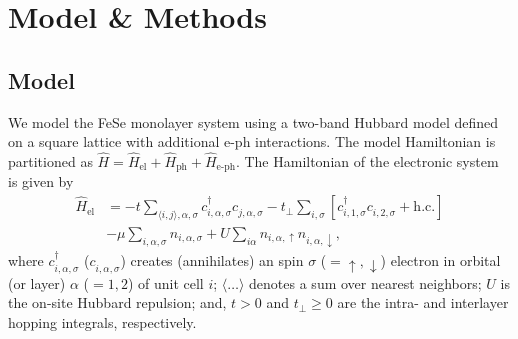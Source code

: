 \documentclass[%
 reprint,
 superscriptaddress,
nofootinbib,
nobibnotes,
 amsmath,amssymb,
 aps,
 prb,
 dvipsnames, 
 floatfix
]{revtex4-2}
\newcommand{\eph}{e-ph}
\newcommand{\pdag}{{\phantom\dagger}}
\begin{document}
\section{Model \& Methods}
\label{Sec:Model}

\subsection{Model}
We model the FeSe monolayer system using a two-band Hubbard model \cite{Mishra2016,Linscheid2016,Pelliciari:2020tu} defined on a square lattice with additional {\eph} interactions. The model Hamiltonian is partitioned as $\hat{H} = \hat{H}_{\text{el}} + \hat{H}_{\text{ph}} + \hat{H}_{\text{\eph}}$. The Hamiltonian of the electronic system is given by  
\begin{align}
    \hat{H}_{\text{el}} &= -t\sum_{\langle i,j\rangle,\alpha, \sigma} 
    c^\dagger_{i,\alpha,\sigma}c^\pdag_{j,\alpha,\sigma} 
    - t^\pdag_\perp \sum_{i,\sigma} \left[c^\dagger_{i, 1, \sigma} c^\pdag_{i, 2, \sigma} + \mathrm{h.c.}\right] \nonumber \\ &
    - \mu \sum_{i, \alpha, \sigma} n_{i, \alpha, \sigma}
    + U \sum_{i \alpha} n_{i , \alpha, \uparrow} n_{i, \alpha, \downarrow}, \label{Eq:Hel}
\end{align}
where $c^\dagger_{i,\alpha,\sigma}$ ($c^\pdag_{i,\alpha,\sigma}$) creates (annihilates) an spin $\sigma$ ($=\uparrow,\downarrow$) electron in orbital (or layer) $\alpha$ ($=1,2$) of unit cell $i$; $\langle \dots \rangle$ denotes a sum over nearest neighbors; $U$ is the on-site Hubbard repulsion; and, $t>0$ and $t_\perp \geq 0$ are the intra- and interlayer hopping integrals, respectively. 
\end{document}
